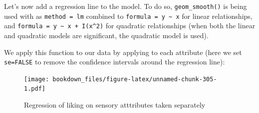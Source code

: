 \documentclass[
]{krantz}
\makeatletter
\newenvironment{Shaded}{\begin{snugshade}}{\end{snugshade}}
\newcommand{\AttributeTok}[1]{\textcolor[rgb]{0.61,0.61,0.61}{#1}}
\newcommand{\ConstantTok}[1]{\textcolor[rgb]{0,0,0}{#1}}
\newcommand{\ControlFlowTok}[1]{\textcolor[rgb]{0.27,0.27,0.27}{\textbf{#1}}}
\newcommand{\FunctionTok}[1]{\textcolor[rgb]{0,0,0}{#1}}
\newcommand{\NormalTok}[1]{#1}
\newcommand{\OtherTok}[1]{\textcolor[rgb]{0.37,0.37,0.37}{#1}}
\newcommand{\SpecialCharTok}[1]{\textcolor[rgb]{0,0,0}{#1}}
\newcommand{\StringTok}[1]{\textcolor[rgb]{0.5,0.5,0.5}{#1}}
\newenvironment{kframe}{%
\medskip{}
\setlength{\fboxsep}{.8em}
 \def\at@end@of@kframe{}%
 \ifinner\ifhmode%
  \def\at@end@of@kframe{\end{minipage}}%
  \begin{minipage}{\columnwidth}%
 \fi\fi%
 \def\FrameCommand##1{\hskip\@totalleftmargin \hskip-\fboxsep
 \colorbox{shadecolor}{##1}\hskip-\fboxsep
     \hskip-\linewidth \hskip-\@totalleftmargin \hskip\columnwidth}%
 \MakeFramed {\advance\hsize-\width
   \@totalleftmargin\z@ \linewidth\hsize
   \@setminipage}}%
 {\par\unskip\endMakeFramed%
 \at@end@of@kframe}
\renewenvironment{Shaded}{\begin{kframe}}{\end{kframe}}
\makeatother
\begin{document}
Let's now add a regression line to the model. To do so, \texttt{geom\_smooth()} is being used with as \texttt{method\ =\ lm} combined to \texttt{formula\ =\ \textquotesingle{}y\ \textasciitilde{}\ x\textquotesingle{}} for linear relationships, and \texttt{formula\ =\ \textquotesingle{}y\ \textasciitilde{}\ x\ +\ I(x\^{}2)\textquotesingle{}} for quadratic relationships (when both the linear and quadratic models are significant, the quadratic model is used).

\begin{Shaded}
\end{Shaded}

We apply this function to our data by applying to each attribute (here we set \texttt{se=FALSE} to remove the confidence intervals around the regression line):

\begin{Shaded}
\end{Shaded}

\begin{figure}
\centering
\texttt{[image: bookdown\_files/figure-latex/unnamed-chunk-305-1.pdf]}
\caption{\label{fig:unnamed-chunk-305}Regression of liking on sensory atttributes taken separately}
\end{figure}
\end{document}
